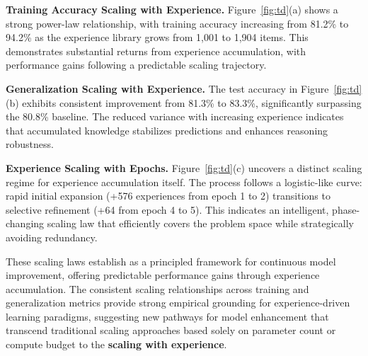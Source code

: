 \textbf{Training Accuracy Scaling with Experience.} Figure~\ref{fig:td}(a) shows a strong power-law relationship, with training accuracy increasing from 81.2\% to 94.2\% as the experience library grows from 1,001 to 1,904 items. This demonstrates substantial returns from experience accumulation, with performance gains following a predictable scaling trajectory.

\textbf{Generalization Scaling with Experience.} The test accuracy in Figure~\ref{fig:td}(b) exhibits consistent improvement from 81.3\% to 83.3\%, significantly surpassing the 80.8\% baseline. The reduced variance with increasing experience indicates that accumulated knowledge stabilizes predictions and enhances reasoning robustness.

\textbf{Experience Scaling with Epochs.} Figure~\ref{fig:td}(c) uncovers a distinct scaling regime for experience accumulation itself. The process follows a logistic-like curve: rapid initial expansion (+576 experiences from epoch 1 to 2) transitions to selective refinement (+64 from epoch 4 to 5). This indicates an intelligent, phase-changing scaling law that efficiently covers the problem space while strategically avoiding redundancy.

These scaling laws establish \method{} as a principled framework for continuous model improvement, offering predictable performance gains through experience accumulation. The consistent scaling relationships across training and generalization metrics provide strong empirical grounding for experience-driven learning paradigms, suggesting new pathways for model enhancement that transcend traditional scaling approaches based solely on parameter count or compute budget to the \textbf{scaling with experience}.

